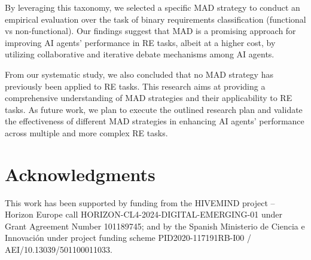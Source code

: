 \documentclass[conference]{IEEEtran}
\begin{document}
By leveraging this taxonomy, we selected a specific MAD strategy to conduct an empirical evaluation over the task of binary requirements classification (functional vs non-functional). Our findings suggest that MAD is a promising approach for improving AI agents' performance in RE tasks, albeit at a higher cost, by utilizing collaborative and iterative debate mechanisms among AI agents.

From our systematic study, we also concluded that no MAD strategy has previously been applied to RE tasks. This research aims at providing a comprehensive understanding of MAD strategies and their applicability to RE tasks. As future work, we plan to execute the outlined research plan and validate the effectiveness of different MAD strategies in enhancing AI agents' performance across multiple and more complex RE tasks.

\section*{Acknowledgments}
This work has been supported by funding from the HIVEMIND project – Horizon Europe call HORIZON-CL4-2024-DIGITAL-EMERGING-01 under Grant Agreement Number 101189745; and  by the Spanish Ministerio de Ciencia e Innovación under project funding scheme PID2020-117191RB-I00 / AEI/10.13039/501100011033.









\end{document}

